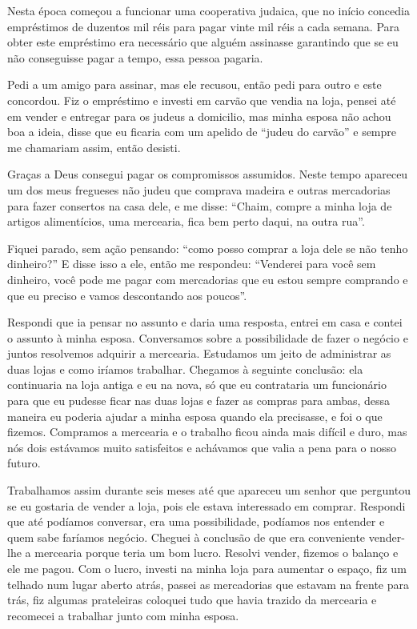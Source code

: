 Nesta época começou a funcionar uma cooperativa judaica, que no início
concedia empréstimos de duzentos mil réis para pagar vinte mil réis a
cada semana. Para obter este empréstimo era necessário que alguém
assinasse garantindo que se eu não conseguisse pagar a tempo, essa
pessoa pagaria.

Pedi a um amigo para assinar, mas ele recusou, então pedi para outro e
este concordou. Fiz o empréstimo e investi em carvão que vendia na loja,
pensei até em vender e entregar para os judeus a domicilio, mas minha
esposa não achou boa a ideia, disse que eu ficaria com um apelido de
``judeu do carvão'' e sempre me chamariam assim, então desisti.

Graças a Deus consegui pagar os compromissos assumidos. Neste tempo
apareceu um dos meus fregueses não judeu que comprava madeira e outras
mercadorias para fazer consertos na casa dele, e me disse: ``Chaim,
compre a minha loja de artigos alimentícios, uma mercearia, fica bem
perto daqui, na outra rua''.

Fiquei parado, sem ação pensando: ``como posso comprar a loja dele se
não tenho dinheiro?'' E disse isso a ele, então me respondeu: ``Venderei
para você sem dinheiro, você pode me pagar com mercadorias que eu estou
sempre comprando e que eu preciso e vamos descontando aos poucos''.

Respondi que ia pensar no assunto e daria uma resposta, entrei em casa e
contei o assunto à minha esposa. Conversamos sobre a possibilidade de
fazer o negócio e juntos resolvemos adquirir a mercearia. Estudamos um
jeito de administrar as duas lojas e como iríamos trabalhar. Chegamos à
seguinte conclusão: ela continuaria na loja antiga e eu na nova, só que
eu contrataria um funcionário para que eu pudesse ficar nas duas lojas e
fazer as compras para ambas, dessa maneira eu poderia ajudar a minha
esposa quando ela precisasse, e foi o que fizemos. Compramos a mercearia
e o trabalho ficou ainda mais difícil e duro, mas nós dois estávamos
muito satisfeitos e achávamos que valia a pena para o nosso futuro.

Trabalhamos assim durante seis meses até que apareceu um senhor que
perguntou se eu gostaria de vender a loja, pois ele estava interessado
em comprar. Respondi que até podíamos conversar, era uma possibilidade,
podíamos nos entender e quem sabe faríamos negócio. Cheguei à conclusão
de que era conveniente vender-lhe a mercearia porque teria um bom lucro.
Resolvi vender, fizemos o balanço e ele me pagou. Com o lucro, investi
na minha loja para aumentar o espaço, fiz um telhado num lugar aberto
atrás, passei as mercadorias que estavam na frente para trás, fiz
algumas prateleiras coloquei tudo que havia trazido da mercearia e
recomecei a trabalhar junto com minha esposa.

